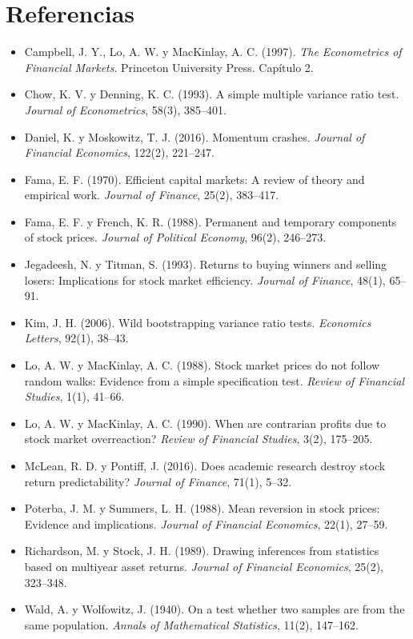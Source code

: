 \section*{Referencias}
\begin{itemize}[leftmargin=*]
  \item Campbell, J. Y., Lo, A. W. y MacKinlay, A. C. (1997). \emph{The Econometrics of Financial Markets}.
        Princeton University Press. Capítulo 2.
  \item Chow, K. V. y Denning, K. C. (1993). A simple multiple variance ratio test. \emph{Journal of
        Econometrics}, 58(3), 385--401.
  \item Daniel, K. y Moskowitz, T. J. (2016). Momentum crashes. \emph{Journal of Financial Economics}, 122(2),
        221--247.
  \item Fama, E. F. (1970). Efficient capital markets: A review of theory and empirical work. \emph{Journal of
        Finance}, 25(2), 383--417.
  \item Fama, E. F. y French, K. R. (1988). Permanent and temporary components of stock prices. \emph{Journal
        of Political Economy}, 96(2), 246--273.
  \item Jegadeesh, N. y Titman, S. (1993). Returns to buying winners and selling losers: Implications for stock
        market efficiency. \emph{Journal of Finance}, 48(1), 65--91.
  \item Kim, J. H. (2006). Wild bootstrapping variance ratio tests. \emph{Economics Letters}, 92(1), 38--43.
  \item Lo, A. W. y MacKinlay, A. C. (1988). Stock market prices do not follow random walks: Evidence from a
        simple specification test. \emph{Review of Financial Studies}, 1(1), 41--66.
  \item Lo, A. W. y MacKinlay, A. C. (1990). When are contrarian profits due to stock market overreaction?
        \emph{Review of Financial Studies}, 3(2), 175--205.
  \item McLean, R. D. y Pontiff, J. (2016). Does academic research destroy stock return predictability?
        \emph{Journal of Finance}, 71(1), 5--32.
  \item Poterba, J. M. y Summers, L. H. (1988). Mean reversion in stock prices: Evidence and implications.
        \emph{Journal of Financial Economics}, 22(1), 27--59.
  \item Richardson, M. y Stock, J. H. (1989). Drawing inferences from statistics based on multiyear asset
        returns. \emph{Journal of Financial Economics}, 25(2), 323--348.
  \item Wald, A. y Wolfowitz, J. (1940). On a test whether two samples are from the same population.
        \emph{Annals of Mathematical Statistics}, 11(2), 147--162.
\end{itemize}
